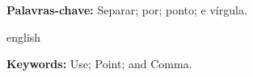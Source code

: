 \setlength{\absparsep}{18pt} %
\begin{resumo}

\textbf{Palavras-chave:} Separar; por; ponto; e vírgula.

\end{resumo}

\begin{resumo}[Abstract]
 \begin{otherlanguage*}{english}

\textbf{Keywords:} Use; Point; and Comma.
   \vspace{\onelineskip}

   \noindent
 \end{otherlanguage*}
\end{resumo}


